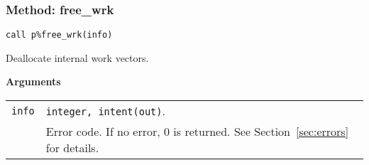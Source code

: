 \subsubsection{Method: free\_wrk}

\begin{center}
\verb|call p%free_wrk(info)|\\
\end{center}

\noindent
Deallocate internal work vectors.

{\baselineskip\noindent\large\bfseries Arguments} \smallskip

\begin{tabular}{p{1.2cm}p{12cm}}
\verb|info|   & \verb|integer, intent(out)|.\\
              & Error code. If no error, 0 is returned. See Section~\ref{sec:errors} for details.\\
\end{tabular}





